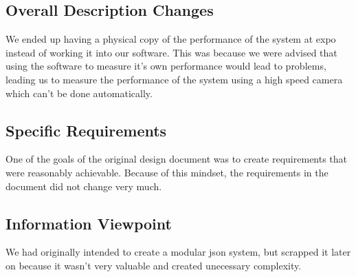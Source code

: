\subsection{Overall Description Changes}
We ended up having a physical copy of the performance of the system at expo instead of working it into our software. This was because we were advised that using the software to measure it's own performance would lead to problems, leading us to measure the performance of the system using a high speed camera which can't be done automatically.
\subsection{Specific Requirements}
One of the goals of the original design document was to create requirements that were reasonably achievable. Because of this mindset, the requirements in the document did not change very much.
\subsection{Information Viewpoint}
We had originally intended to create a modular json system, but scrapped it later on because it wasn't very valuable and created unecessary complexity.
